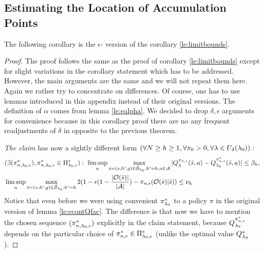 \subsection{Estimating the Location of Accumulation Points}
The following corollary is the $\epsilon$-\eUDRL{} version of the corollary \ref{le:limitbounds}.
\elimitbounds*
\begin{proof}
The proof follows the same as the proof of corollary \ref{le:limitbounds} except for slight variations in the corollary statement which has to be addressed. However, the main arguments are the same and we will not repeat them here. Again we rather try to
concentrate on differences. Of course, one has to use lemmas introduced in this appendix instead of their original versions.
The definition of $\alpha$ comes from lemma \ref{le:ealpha}.
We decided to drop $\delta,\epsilon$ arguments for convenience because
in this corollary proof there are no any frequent readjustments of
$\delta$ in opposite to the previous theorem.

\emph{The claim} has now a sightly different form $(\forall  N \geq h \geq 1, \forall \pi_0 >0 , \forall \mathit{\lambda} \in U_{\delta}(\mathit{\lambda}_0)):$
\begin{align*}
&
(\exists (\pi_{n,\mathit{\lambda}_0,\epsilon}^*), \pi_{n,\mathit{\lambda}_0,\epsilon}^*\in \Pi_{\mathit{\lambda}_0,\epsilon}^*):
\;
\limsup_n
\max_{\bar{s} = (s,h',g) \in\bar{\mathcal{S}}_{\mathit{\lambda}_0},h'=h, a \in \mathcal{A}}
|Q_{\mathit{\lambda}}^{\pi_{n,\epsilon}}(\bar{s},a) - Q_{\mathit{\lambda}_0}^{\pi_{n,\epsilon}^*}(\bar{s},a)| \leq \beta_h,
\\
&\limsup_n
\max_{\bar{s} = (s,h',g) \in\bar{\mathcal{S}}_{\mathit{\lambda}_0},h'=h}
2 (1-\epsilon(1-\frac{|\mathcal{O}(\bar{s})|}{|\mathcal{A}|})-\pi_{n,\epsilon}(\mathcal{O}(\bar{s})|\bar{s}))
\leq \nu_h
\end{align*}
Notice that even before we were using convenient $\pi_{\mathit{\lambda}_0}^*$
to a policy $\pi$ in the original version of lemma \ref{le:econtQfac}. The difference is that now
we have to mention the chosen sequence $(\pi_{n,\mathit{\lambda}_0,\epsilon}^*)$ explicitly in the claim
statement, because $Q_{\mathit{\lambda}_0}^{\pi_{n,\epsilon}^*}$ depends on the particular choice of $\pi_{n,\epsilon}^* \in \Pi_{\mathit{\lambda}_0,\epsilon}^*$ (unlike the optimal value $Q_{\mathit{\lambda}_0}^*$).


\end{proof}
